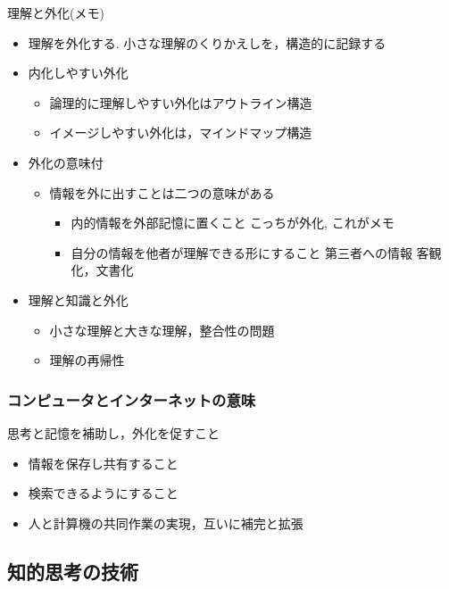 \documentclass[dvipdfmx,11pat]{jarticle}
\begin{document}
理解と外化(メモ)  
\begin{itemize}
\item 理解を外化する. 小さな理解のくりかえしを，構造的に記録する
\item 内化しやすい外化
\begin{itemize}
\item 論理的に理解しやすい外化はアウトライン構造
\item イメージしやすい外化は，マインドマップ構造
\end{itemize}
\item 外化の意味付
\begin{itemize}
\item 情報を外に出すことは二つの意味がある
\begin{itemize}
\item 内的情報を外部記憶に置くこと
こっちが外化, これがメモ
\item 自分の情報を他者が理解できる形にすること
第三者への情報 客観化，文書化
\end{itemize}
\end{itemize}

\item 理解と知識と外化
\begin{itemize}
\item 小さな理解と大きな理解，整合性の問題
\item 理解の再帰性
\end{itemize}
\end{itemize}
\subsubsection{コンピュータとインターネットの意味}
\label{sec:orgb95ed1c}
思考と記憶を補助し，外化を促すこと
\begin{itemize}
\item 情報を保存し共有すること
\item 検索できるようにすること
\item 人と計算機の共同作業の実現，互いに補完と拡張
\end{itemize}
\subsection{知的思考の技術}
\label{sec:orgfa144d9}
\end{document}
